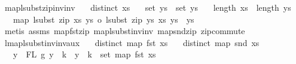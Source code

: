 \begin{isabellebody}
\isamarkupfalse%
%
\endisatagproof
{\isafoldproof}%
%
\isadelimproof
\isanewline
%
\endisadelimproof
\isanewline
\isanewline
{}\isamarkupfalse%
\ map{\isacharunderscore}{\kern0pt}lsubst{\isacharunderscore}{\kern0pt}zip{\isacharunderscore}{\kern0pt}inv{\isacharunderscore}{\kern0pt}inv{\isacharcolon}{\kern0pt}\isanewline
\ \ \ {\isachardoublequoteopen}distinct\ xs{\isachardoublequoteclose}\isanewline
\ \ \ {\isachardoublequoteopen}set\ ys{\isacharprime}{\kern0pt}\ {\isasymsubseteq}\ set\ ys{\isachardoublequoteclose}\isanewline
\ \ \ {\isachardoublequoteopen}length\ xs\ {\isacharequal}{\kern0pt}\ length\ ys{\isachardoublequoteclose}\isanewline
\ \ \ {\isachardoublequoteopen}map\ {\isacharparenleft}{\kern0pt}lsubst\ {\isacharparenleft}{\kern0pt}zip\ xs\ ys{\isacharparenright}{\kern0pt}\ o\ lsubst\ {\isacharparenleft}{\kern0pt}zip\ ys\ xs{\isacharparenright}{\kern0pt}{\isacharparenright}{\kern0pt}\ ys{\isacharprime}{\kern0pt}\ {\isacharequal}{\kern0pt}\ ys{\isacharprime}{\kern0pt}{\isachardoublequoteclose}\isanewline
%
\isadelimproof
%
\endisadelimproof
%
\isatagproof
{}\isamarkupfalse%
\ {\isacharparenleft}{\kern0pt}metis\ assms{\isacharparenleft}{\kern0pt}{}{\isacharcomma}{\kern0pt}{}{\isacharcomma}{\kern0pt}{}{\isacharparenright}{\kern0pt}\ map{\isacharunderscore}{\kern0pt}fst{\isacharunderscore}{\kern0pt}zip\ map{\isacharunderscore}{\kern0pt}lsubst{\isacharunderscore}{\kern0pt}inv{\isacharunderscore}{\kern0pt}inv\ map{\isacharunderscore}{\kern0pt}snd{\isacharunderscore}{\kern0pt}zip\ zip{\isacharunderscore}{\kern0pt}commute{\isacharparenright}{\kern0pt}%
\endisatagproof
{\isafoldproof}%
%
\isadelimproof
\isanewline
%
\endisadelimproof
\isanewline
\isanewline
{}\isamarkupfalse%
\ lmap{\isacharunderscore}{\kern0pt}lsubst{\isacharunderscore}{\kern0pt}inv{\isacharunderscore}{\kern0pt}inv{\isacharunderscore}{\kern0pt}aux{\isacharcolon}{\kern0pt}\isanewline
\ \ \ {\isachardoublequoteopen}distinct\ {\isacharparenleft}{\kern0pt}map\ fst\ xs{\isacharparenright}{\kern0pt}{\isachardoublequoteclose}\isanewline
\ \ \ {\isachardoublequoteopen}distinct\ {\isacharparenleft}{\kern0pt}map\ snd\ xs{\isacharparenright}{\kern0pt}{\isachardoublequoteclose}\isanewline
\ \ \ {\isachardoublequoteopen}{\isasymforall}y\ {\isasymin}\ FL\ g{\isachardot}{\kern0pt}\ y\ {\isachargreater}{\kern0pt}{\isacharequal}{\kern0pt}\ k\ {\isacharminus}{\kern0pt}{\isacharminus}{\kern0pt}{\isachargreater}{\kern0pt}\ y\ {\isacharminus}{\kern0pt}\ k\ {\isasymin}\ set\ {\isacharparenleft}{\kern0pt}map\ fst\ xs{\isacharparenright}{\kern0pt}{\isachardoublequoteclose}\isanewline

\end{isabellebody}
